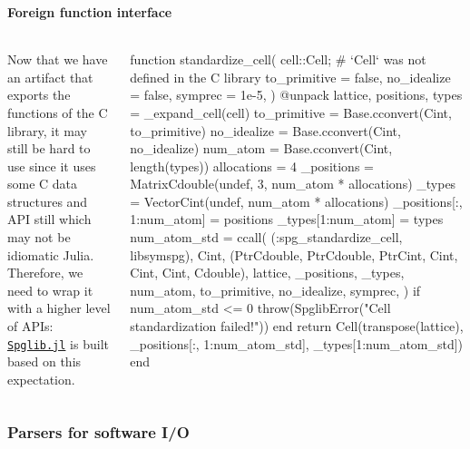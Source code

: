 \begin{frame}[fragile]
    \frametitle{\subsubsecname}
    \framesubtitle{Foreign function interface}

    \begin{columns}
        \begin{column}{0.3\textwidth}
            Now that we have an artifact that exports the functions of the C library,
            it may still be hard to use since it uses some C data structures and API still which may
            not be idiomatic Julia. Therefore, we need to wrap it with a higher level of APIs:
            \href{https://github.com/singularitti/Spglib.jl}{\texttt{Spglib.jl}} is built based on
            this expectation.
        \end{column}

        \begin{column}{0.7\textwidth}
            {\tiny
                \begin{algorithmblock}
                    \begin{juliaverbatim}
function standardize_cell(
    cell::Cell;  # `Cell` was not defined in the C library
    to_primitive = false,
    no_idealize = false,
    symprec = 1e-5,
)
    @unpack lattice, positions, types = _expand_cell(cell)
    to_primitive = Base.cconvert(Cint, to_primitive)
    no_idealize = Base.cconvert(Cint, no_idealize)
    num_atom = Base.cconvert(Cint, length(types))
    allocations = 4
    _positions = Matrix{Cdouble}(undef, 3, num_atom * allocations)
    _types = Vector{Cint}(undef, num_atom * allocations)
    _positions[:, 1:num_atom] = positions
    _types[1:num_atom] = types
    num_atom_std = ccall(
        (:spg_standardize_cell, libsymspg),
        Cint,
        (Ptr{Cdouble}, Ptr{Cdouble}, Ptr{Cint}, Cint, Cint, Cint, Cdouble),
        lattice,
        _positions,
        _types,
        num_atom,
        to_primitive,
        no_idealize,
        symprec,
    )
    if num_atom_std <= 0
        throw(SpglibError("Cell standardization failed!"))
    end
    return Cell(transpose(lattice), _positions[:, 1:num_atom_std], _types[1:num_atom_std])
end
                    \end{juliaverbatim}
                \end{algorithmblock}
            }
        \end{column}
    \end{columns}
\end{frame}

\subsubsection{Parsers for \ab{} software I/O}

